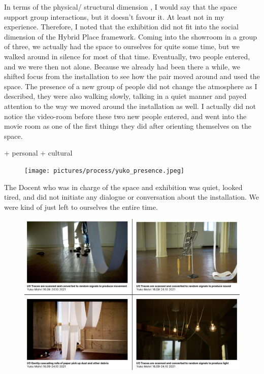In terms of the physical/ structural dimension \autocite{hybridplace_ciolfi}, I would say that the space support group interactions, but it doesn't favour it. At least not in my experience. Therefore, I noted that the exhibition did not fit into the social dimension of the Hybrid Place framework. Coming into the showroom in a group of three, we actually had the space to ourselves for quite some time, but we walked around in silence for most of that time. Eventually, two people entered, and we were then not alone. Because we already had been there a while, we shifted focus from the installation to see how the pair moved around and used the space. The presence of a new group of people did not change the atmosphere as I described, they were also walking slowly, talking in a quiet manner and payed attention to the way we moved around the installation as well. I actually did not notice the video-room before these two new people entered, and went into the movie room as one of the first things they did after orienting themselves on the space. 

+ personal
+ cultural


\begin{figure}[H]
\texttt{[image: pictures/process/yuko\_presence.jpeg]}
\centering 
\end{figure}

The Docent who was in charge of the space and exhibition was quiet, looked tired, and did not initiate any dialogue or conversation about the installation. We were kind of just left to ourselves the entire time.


\begin{figure}[H]
\includegraphics[width=12cm]{pictures/dataset/yuko_mohri.png}
\centering 
\end{figure}


